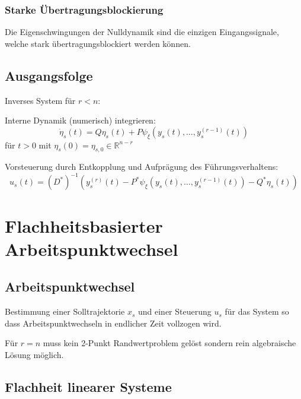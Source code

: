 \subsubsection{Starke Übertragungsblockierung}
Die Eigenschwingungen der Nulldynamik sind die einzigen Eingangssignale, welche stark
übertragungsblockiert werden können.

\subsection{Ausgangsfolge}
Inverses System für $r<n$:

Interne Dynamik (numerisch) integrieren:
\begin{equation}
    \dot{\eta}_s(t) = Q \eta_s(t) + P \psi_\xi(y_s(t), \ldots, y_s^{(r-1)}(t))
\end{equation}
für $t>0$ mit $\eta_s(0) = \eta_{s,0} \in \mathbb{R}^{n-r}$

Vorsteuerung durch Entkopplung und Aufprägung des Führungsverhaltens:
\begin{equation}
        u_s(t) = {(D^*)}^{-1} \left(y_s^{(r)}(t) - P^* \psi_\xi\left(y_s(t), \ldots, y_s^{(r-1)}(t)\right)
        - Q^* \eta_s(t)\right)
\end{equation}

\section{Flachheitsbasierter Arbeitspunktwechsel}
\subsection{Arbeitspunktwechsel}
Bestimmung einer Solltrajektorie $x_s$ und einer Steuerung $u_s$ für
das System so dass Arbeitspunktwechseln in endlicher Zeit vollzogen wird.

Für $r=n$ muss kein 2-Punkt Randwertproblem gelöst sondern rein algebraische
Lösung möglich.



\subsection{Flachheit linearer Systeme}
